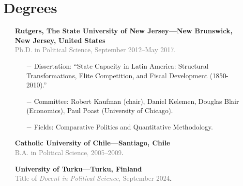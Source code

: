 \section*{Degrees}

\begin{itemize}
  \item[\textcolor{gray}{\textbullet}] {\bf Rutgers, The State University of New Jersey---New Brunswick, New Jersey, United States}\\
  \textcolor{gray}{Ph.D. in Political Science, September 2012--May 2017}.
    	\begin{itemize}
      		\item[$-$] Dissertation: ``State Capacity in Latin America: Structural Transformations, Elite Competition, and Fiscal Development (1850-2010).''
      		\item[$-$] Committee: Robert Kaufman (chair), Daniel Kelemen, Douglas Blair (Economics), Paul Poast (University of Chicago).
          \item[$-$] Fields: Comparative Politics and Quantitative Methodology.
		  \end{itemize}

\item[\textcolor{gray}{\textbullet}] {\bf Catholic University of Chile---Santiago, Chile}\\
\textcolor{gray}{B.A. in Political Science, 2005--2009}.

  \item[\textcolor{gray}{\textbullet}] {\bf University of Turku---Turku, Finland}\\
  \textcolor{gray}{Title of \emph{Docent in Political Science}, September 2024}.

\end{itemize}
